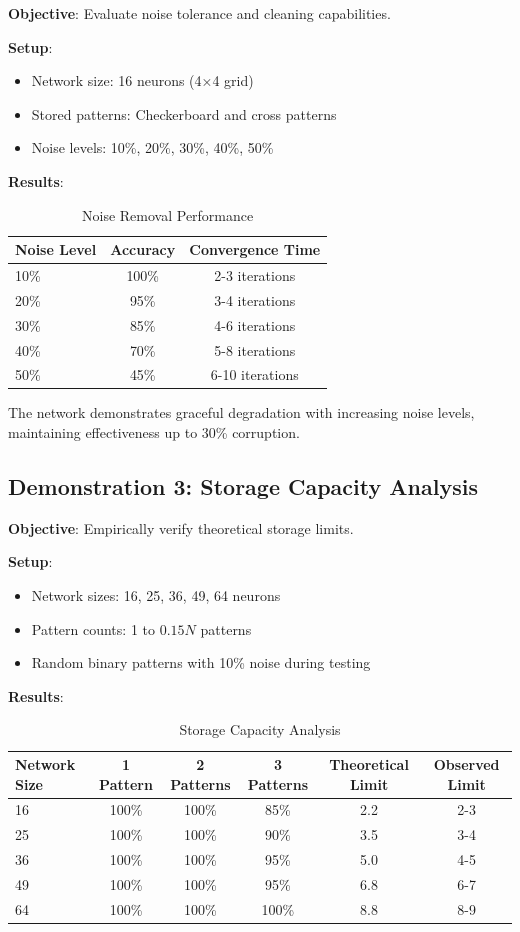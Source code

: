 \documentclass[11pt,a4paper]{article}
\begin{document}
\textbf{Objective}: Evaluate noise tolerance and cleaning capabilities.

\textbf{Setup}:
\begin{itemize}
    \item Network size: 16 neurons (4×4 grid)
    \item Stored patterns: Checkerboard and cross patterns
    \item Noise levels: 10\%, 20\%, 30\%, 40\%, 50\%
\end{itemize}

\textbf{Results}:
\begin{table}[H]
\centering
\caption{Noise Removal Performance}
\begin{tabular}{@{}lcc@{}}
\toprule
Noise Level & Accuracy & Convergence Time \\
\midrule
10\% & 100\% & 2-3 iterations \\
20\% & 95\% & 3-4 iterations \\
30\% & 85\% & 4-6 iterations \\
40\% & 70\% & 5-8 iterations \\
50\% & 45\% & 6-10 iterations \\
\bottomrule
\end{tabular}
\label{tab:noise}
\end{table}

The network demonstrates graceful degradation with increasing noise levels, maintaining effectiveness up to 30\% corruption.

\subsection{Demonstration 3: Storage Capacity Analysis}

\textbf{Objective}: Empirically verify theoretical storage limits.

\textbf{Setup}:
\begin{itemize}
    \item Network sizes: 16, 25, 36, 49, 64 neurons
    \item Pattern counts: 1 to $0.15N$ patterns
    \item Random binary patterns with 10\% noise during testing
\end{itemize}

\textbf{Results}:
\begin{table}[H]
\centering
\caption{Storage Capacity Analysis}
\begin{tabular}{@{}lccccc@{}}
\toprule
Network Size & 1 Pattern & 2 Patterns & 3 Patterns & Theoretical Limit & Observed Limit \\
\midrule
16 & 100\% & 100\% & 85\% & 2.2 & 2-3 \\
25 & 100\% & 100\% & 90\% & 3.5 & 3-4 \\
36 & 100\% & 100\% & 95\% & 5.0 & 4-5 \\
49 & 100\% & 100\% & 95\% & 6.8 & 6-7 \\
64 & 100\% & 100\% & 100\% & 8.8 & 8-9 \\
\bottomrule
\end{tabular}
\label{tab:capacity}
\end{table}
\end{document}

